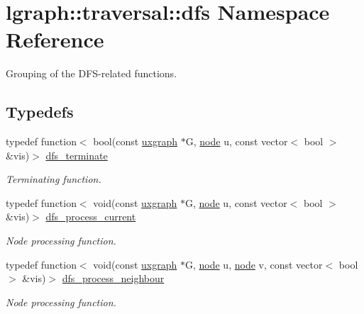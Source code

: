 \hypertarget{namespacelgraph_1_1traversal_1_1dfs}{}\section{lgraph\+:\+:traversal\+:\+:dfs Namespace Reference}
\label{namespacelgraph_1_1traversal_1_1dfs}


Grouping of the D\+F\+S-\/related functions.  


\subsection*{Typedefs}
\begin{DoxyCompactItemize}
\item 
typedef function$<$ bool(const \hyperlink{classlgraph_1_1utils_1_1uxgraph}{uxgraph} $\ast$G, \hyperlink{namespacelgraph_1_1utils_a7bd66ede3805ef121bc2835bd48de0cf}{node} u, const vector$<$ bool $>$ \&vis)$>$ \hyperlink{namespacelgraph_1_1traversal_1_1dfs_a41b39b9a31fd3665c970a6eb70564765}{dfs\+\_\+terminate}
\begin{DoxyCompactList}\small\item\em Terminating function. \end{DoxyCompactList}\item 
typedef function$<$ void(const \hyperlink{classlgraph_1_1utils_1_1uxgraph}{uxgraph} $\ast$G, \hyperlink{namespacelgraph_1_1utils_a7bd66ede3805ef121bc2835bd48de0cf}{node} u, const vector$<$ bool $>$ \&vis)$>$ \hyperlink{namespacelgraph_1_1traversal_1_1dfs_a918161e9face694d4ebdc4ba13cdd5ac}{dfs\+\_\+process\+\_\+current}
\begin{DoxyCompactList}\small\item\em Node processing function. \end{DoxyCompactList}\item 
typedef function$<$ void(const \hyperlink{classlgraph_1_1utils_1_1uxgraph}{uxgraph} $\ast$G, \hyperlink{namespacelgraph_1_1utils_a7bd66ede3805ef121bc2835bd48de0cf}{node} u, \hyperlink{namespacelgraph_1_1utils_a7bd66ede3805ef121bc2835bd48de0cf}{node} v, const vector$<$ bool $>$ \&vis)$>$ \hyperlink{namespacelgraph_1_1traversal_1_1dfs_af04d72933b75432a505b1235d173da4b}{dfs\+\_\+process\+\_\+neighbour}
\begin{DoxyCompactList}\small\item\em Node processing function. \end{DoxyCompactList}\end{DoxyCompactItemize}
